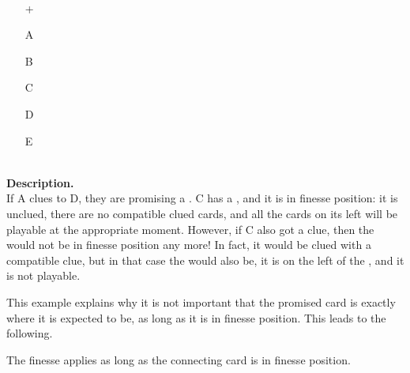 \begin{example} \hfill \\
	\begin{minipage}{0.45\textwidth}
		\begin{itemize}
			\item[\Large +]      
			\item[\Large A]    
			\item[\Large B]    
			\item[\Large C]    
			\item[\Large D]    
			\item[\Large E]    
		\end{itemize}
	\end{minipage}%
	\begin{minipage}{0.55\textwidth}
		\hfill \\
		
		\textbf{Description.} \\
		
		If A clues  to D, they are promising a . C has a , and it is in finesse position: it is unclued, there are no compatible clued cards, and all the cards on its left will be playable at the appropriate moment. However, if C also got a  clue, then the  would not be in finesse position any more! In fact, it would be clued with a compatible clue, but in that case the  would also be, it is on the left of the , and it is not playable.
	\end{minipage}
\end{example} \vspace{0.15 cm}

This example explains why it is not important that the promised card is exactly where it is expected to be, as long as it is in finesse position. This leads to the following.

\begin{convention}
	\label{layered-finesse}
	The finesse applies as long as the connecting card is in finesse position.
\end{convention}

